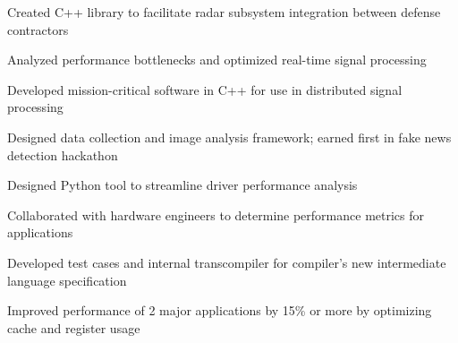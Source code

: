\documentclass[]{resume-style}
\begin{document}
\vspace{2mm}
\vspace{-1.35mm}
\begin{tightemize}
\vspace{\topsep} %
\item Created C++ library to facilitate radar subsystem integration between defense contractors
\item Analyzed performance bottlenecks and optimized real-time signal processing
\item Developed mission-critical software in C++ for use in distributed signal processing
\item Designed data collection and image analysis framework; earned first in fake news detection hackathon
\end{tightemize}

\vspace{2mm}
\vspace{0.65mm}
\vspace{1.28mm}
\begin{tightemize}
\item Designed Python tool to streamline driver performance analysis
\item Collaborated with hardware engineers to determine performance metrics for applications
\item Developed test cases and internal transcompiler for compiler's new intermediate language specification
\item Improved performance of 2 major applications by 15\% or more by optimizing cache and register usage%
\end{tightemize}
\end{document}
